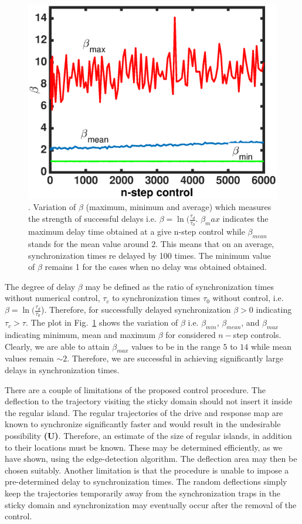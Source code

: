 \documentclass[reprint,superscriptaddress,amsmath,amssymb,aps,pre]{revtex4-1}
\begin{document}
\begin{figure}[t]
	\includegraphics[scale=0.45]{Strength_con.eps}
	\caption{\label{fig:Strength_con} \footnotesize. Variation of $\beta$ 
		(maximum, minimum and average) which measures the strength of successful 
		delays i.e. $\beta = \ln(\frac{\tau_d}{\tau_0}$. $\beta_max$ indicates the 
		maximum delay time obtained at a give n-step control while $\beta_{mean}$ 
		stands for the mean value around 2. This means that on an average, 
		synchronization times re delayed by 100 times. The minimum value of $\beta$ 
		remains 1 for the cases when no delay was obtained obtained. }
\end{figure}


The degree of delay $\beta$ may be defined as the ratio of synchronization times without numerical control, $\tau_c$ to synchronization times $\tau_0$ without control, i.e. $\beta =  \ln(\frac{\tau_d}{\tau_0}$).  Therefore, for successfully delayed synchronization $\beta>0$ indicating $\tau_c > \tau$. 
The plot in Fig.~\ref{fig:Strength_con} shows the variation of $\beta$ i.e. 
$\beta_{min}$, $\beta_{mean}$, and $\beta_{max}$  indicating minimum, mean 
and maximum $\beta$ for considered $n-$step controls. Clearly, we are able 
to attain $\beta_{max}$ values to be in the range $5$ to $14$ while mean 
values remain $\sim2$. Therefore, we are successful in achieving 
significantly large delays in synchronization times. 


There are a couple of limitations of the proposed control procedure. The deflection to the trajectory visiting the sticky domain should not insert it inside the regular island. The regular trajectories of the drive and response map are known to synchronize significantly faster and would result in the undesirable possibility \textbf{(U)}. Therefore, an estimate of the size of regular islands, in addition to their locations must be known. These may be determined efficiently, as we have shown, using the edge-detection algorithm. The deflection area  may then be chosen suitably.  Another limitation is that the procedure is unable to impose a pre-determined delay to synchronization times. The random deflections simply keep the trajectories temporarily away from the synchronization traps in the sticky domain and synchronization may eventually occur after the removal of the control. 
\end{document}
